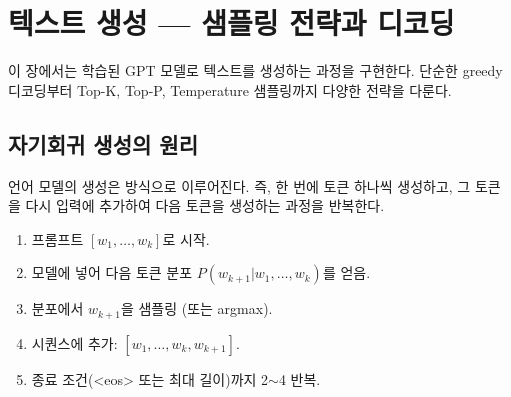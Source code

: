 \chapter{텍스트 생성 — 샘플링 전략과 디코딩}
\label{ch:generation}

이 장에서는 학습된 GPT 모델로 텍스트를 생성하는 과정을 구현한다. 단순한 greedy 디코딩부터 Top-K, Top-P, Temperature 샘플링까지 다양한 전략을 다룬다.

\section{자기회귀 생성의 원리}

언어 모델의 생성은  방식으로 이루어진다. 즉, 한 번에 토큰 하나씩 생성하고, 그 토큰을 다시 입력에 추가하여 다음 토큰을 생성하는 과정을 반복한다.

\begin{enumerate}
  \item 프롬프트 $[w_1, \dots, w_k]$로 시작.
  \item 모델에 넣어 다음 토큰 분포 $P(w_{k+1} | w_1, \dots, w_k)$를 얻음.
  \item 분포에서 $w_{k+1}$을 샘플링 (또는 argmax).
  \item 시퀀스에 추가: $[w_1, \dots, w_k, w_{k+1}]$.
  \item 종료 조건(<eos> 또는 최대 길이)까지 2$\sim$4 반복.
\end{enumerate}

